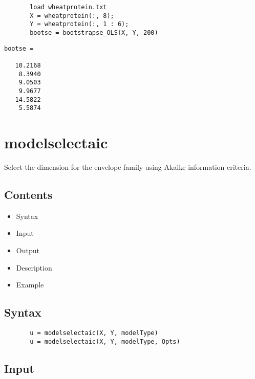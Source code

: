 \documentclass[a4paper,11pt,openany]{memoir}
\begin{document}
\begin{verbatim}       load wheatprotein.txt
       X = wheatprotein(:, 8);
       Y = wheatprotein(:, 1 : 6);
       bootse = bootstrapse_OLS(X, Y, 200)\end{verbatim}
    
        \color{lightgray}\ttfamily \begin{verbatim}
bootse =

   10.2168
    8.3940
    9.0503
    9.9677
   14.5822
    5.5874

\end{verbatim} \rmfamily
\color{black}

\newpage
    
\rmfamily
\color{black}\section{modelselectaic}

\begin{par}
Select the dimension for the envelope family using Akaike information criteria.
\end{par} \vspace{1em}

\subsection*{Contents}

\begin{itemize}
\setlength{\itemsep}{-1ex}
   \item Syntax
   \item Input
   \item Output
   \item Description
   \item Example
\end{itemize}


\subsection*{Syntax}


\begin{verbatim}       u = modelselectaic(X, Y, modelType)
       u = modelselectaic(X, Y, modelType, Opts)\end{verbatim}
    

\subsection*{Input}
\end{document}
